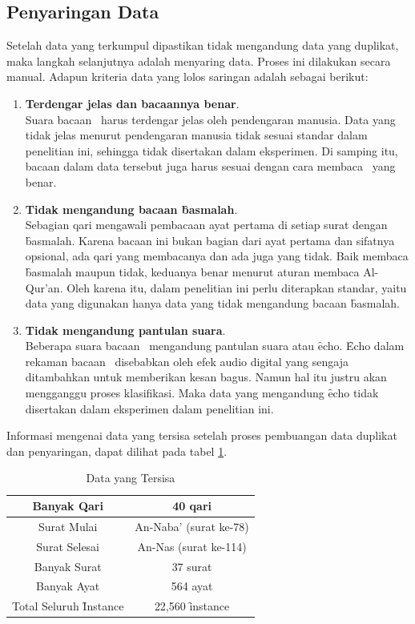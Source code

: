   \subsection{Penyaringan Data}
  Setelah data yang terkumpul dipastikan tidak mengandung data yang duplikat, maka langkah selanjutnya adalah menyaring data. Proses ini dilakukan secara manual. Adapun kriteria data yang lolos saringan adalah sebagai berikut:
  \begin{enumerate}
    \item \textbf{Terdengar jelas dan bacaannya benar}.\\
    Suara bacaan \quran~harus terdengar jelas oleh pendengaran manusia. Data yang tidak jelas menurut pendengaran manusia tidak sesuai standar dalam penelitian ini, sehingga tidak disertakan dalam eksperimen. Di samping itu, bacaan dalam data tersebut juga harus sesuai dengan cara membaca \quran~yang benar.

    \item \textbf{Tidak mengandung bacaan \f{basmalah}}.\\
    Sebagian qari mengawali pembacaan ayat pertama di setiap surat dengan \f{basmalah}. Karena bacaan ini bukan bagian dari ayat pertama dan sifatnya opsional, ada qari yang membacanya dan ada juga yang tidak. Baik membaca \f{basmalah} maupun tidak, keduanya benar menurut aturan membaca Al-Qur'an. Oleh karena itu, dalam penelitian ini perlu diterapkan standar, yaitu data yang digunakan hanya data yang tidak mengandung bacaan \f{basmalah}.

    \item \textbf{Tidak mengandung pantulan suara}.\\
    Beberapa suara bacaan \quran~mengandung pantulan suara atau \f{echo}. \f{Echo} dalam rekaman bacaan \quran~disebabkan oleh efek audio digital yang sengaja ditambahkan untuk memberikan kesan bagus. Namun hal itu justru akan mengganggu proses klasifikasi. Maka data yang mengandung \f{echo} tidak disertakan dalam eksperimen dalam penelitian ini.
  \end{enumerate}

  Informasi mengenai data yang tersisa setelah proses pembuangan data duplikat dan penyaringan, dapat dilihat pada tabel \ref{table:data yang tersisa}.
  
  \begin{table}
    \centering
    \caption{Data yang Tersisa}
    \begin{tabular}{|c|c|}
      \hline
      Banyak Qari & 40 qari \\ \hline
      Surat Mulai & An-Naba' (surat ke-78) \\ \hline
      Surat Selesai & An-Nas (surat ke-114) \\ \hline
      Banyak Surat & 37 surat \\ \hline
      Banyak Ayat & 564 ayat \\ \hline
      Total Seluruh \f{Instance} & 22,560 \f{instance} \\ \hline
    \end{tabular}
    \label{table:data yang tersisa}
  \end{table}




